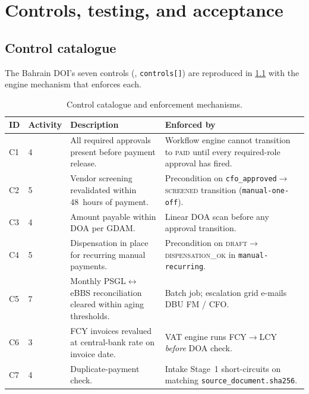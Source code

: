 \chapter{Controls, testing, and acceptance}\label{ch:controls}

\section{Control catalogue}

The Bahrain DOI's seven controls
(\corpus{},
\texttt{controls[]}) are reproduced in \cref{tab:controls} with the
engine mechanism that enforces each.

\begin{table}[htbp]
\centering
\caption{Control catalogue and enforcement mechanisms.}
\label{tab:controls}
\small
\begin{tabularx}{\linewidth}{@{}l l X X@{}}
\toprule
\textbf{ID} & \textbf{Activity} & \textbf{Description} & \textbf{Enforced by} \\ \midrule
C1 & 4 & All required approvals present before payment release. & Workflow engine cannot transition to \textsc{paid} until every required-role approval has fired. \\
C2 & 5 & Vendor screening revalidated within 48~hours of payment. & Precondition on \texttt{cfo\_approved}$\to$\textsc{screened} transition (\texttt{manual-one-off}). \\
C3 & 4 & Amount payable within DOA per GDAM. & Linear DOA scan before any approval transition. \\
C4 & 5 & Dispensation in place for recurring manual payments. & Precondition on \textsc{draft}$\to$\textsc{dispensation\_ok} in \texttt{manual-recurring}. \\
C5 & 7 & Monthly PSGL$\leftrightarrow$eBBS reconciliation cleared within aging thresholds. & Batch job; escalation grid e-mails DBU FM / CFO. \\
C6 & 3 & FCY invoices revalued at central-bank rate on invoice date. & VAT engine runs FCY$\to$LCY \emph{before} DOA check. \\
C7 & 4 & Duplicate-payment check. & Intake Stage~1 short-circuits on matching \texttt{source\_document.sha256}. \\
\bottomrule
\end{tabularx}
\end{table}

